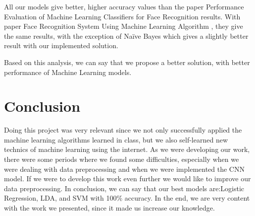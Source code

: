 \documentclass[conference]{IEEEtran}
\begin{document}
All our models give better, higher accuracy values than the paper Performance Evaluation of Machine Learning Classifiers for Face Recognition \cite{9716171} results. With paper Face Recognition System Using Machine Learning Algorithm \cite{9137850}, they give the same results, with the exception of Naïve Bayes which gives a slightly better result with our implemented solution.

Based on this analysis, we can say that we propose a better solution, with better performance of Machine Learning models.

\section{Conclusion}

Doing this project was very relevant since we not only successfully applied the machine learning algorithms learned in class, but we also self-learned new technics of machine learning using the internet. 
As we were developing our work, there were some periods where we found some difficulties, especially when we were dealing with data preprocessing and when we were implemented the CNN model. If we were to develop this work even further we would like to improve our data preprocessing. 
In conclusion, we can say that our best models are:Logistic Regression, LDA, and SVM with 100\% accuracy.
 In the end, we are very content with the work we presented, since it made us increase our knowledge.


\printbibliography
\end{document}
